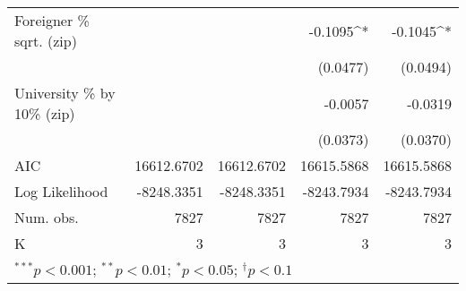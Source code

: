 \begin{tabular}{l D{.}{.}{5.11} D{.}{.}{5.5} D{.}{.}{5.11} D{.}{.}{5.5}}
Foreigner \% sqrt. (zip)          &                  &             & -0.1095^{*}      & -0.1045^{*} \\
                                  &                  &             & (0.0477)         & (0.0494)    \\
University \% by 10\% (zip)       &                  &             & -0.0057          & -0.0319     \\
                                  &                  &             & (0.0373)         & (0.0370)    \\
\midrule
AIC                               & 16612.6702       & 16612.6702  & 16615.5868       & 16615.5868  \\
Log Likelihood                    & -8248.3351       & -8248.3351  & -8243.7934       & -8243.7934  \\
Num. obs.                         & 7827             & 7827        & 7827             & 7827        \\
K                                 & 3                & 3           & 3                & 3           \\
\bottomrule
{}
\end{tabular}

